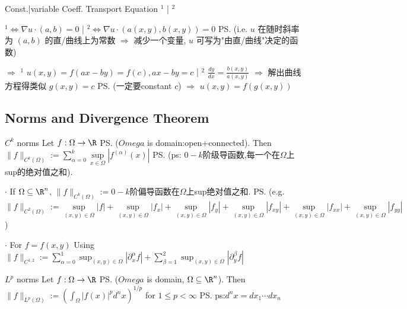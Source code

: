 \documentclass{note}
\begin{document}
\begin{MyTh}{Const.|variable Coeff. Transport Equation}
    $^1$ \quad | \quad $^2$

    \quad $^1\Leftrightarrow \nabla u \cdot (a,b) = 0$ \quad | \quad $^2\Leftrightarrow \nabla u \cdot (a(x,y),b(x,y)) = 0$ \qquad \ps{(i.e. $u$ 在随时斜率为 $(a,b)$ 的直/曲线上为常数 $\Rightarrow$ 减少一个变量, $u$ 可写为"由直/曲线"决定的函数)}
    
    \quad $\Rightarrow$ $^1$ $u(x,y)=f(ax-by)=f(c), ax-by=c$ \quad | \quad $^2$ $\frac{dy}{dx}=\frac{b(x,y)}{a(x,y)}$ $\Rightarrow$ {\scriptsize 解出曲线方程得类似 $g(x,y)=c$ \ps{(一定要constant $c$)}} $\Rightarrow$ $u(x,y)=f(g(x,y))$
\end{MyTh}


\subsection{Norms and Divergence Theorem}

\vspace{-8pt}
\begin{MyTh}{$C^k$ norms}
    Let $f:\Omega\to\R$ \ps{($Omega$ is domain:open+connected)}. Then $\|f\|_{C^k(\Omega)}:=\sum\limits_{\alpha=0}^k\sup\limits_{x\in\Omega}|f^{(\alpha)}(x)|$ \ps{(ps: $0-k$阶级导函数,每一个在$\Omega$上sup的绝对值之和)}.

    \vspace{-3pt}
    \quad $\cdot$ If $\Omega\subseteq\R^n$, $\|f\|_{C^k(\Omega)}:=${\footnotesize $0-k$阶偏导函数在$\Omega$上sup绝对值之和}. \ps{(e.g. $\|f\|_{C^2(\Omega)}:=\sup\limits_{(x,y)\in\Omega}|f|+\sup\limits_{(x,y)\in\Omega}|f_x|+\sup\limits_{(x,y)\in\Omega}|f_y|+\sup\limits_{(x,y)\in\Omega}|f_{xy}|+\sup\limits_{(x,y)\in\Omega}|f_{xx}|+\sup\limits_{(x,y)\in\Omega}|f_{yy}|$)}

    \vspace{-3pt}
    \quad $\cdot$ For $f=f(x,y)$ Using $\|f\|_{C^{1,2}}:=\sum_{\alpha=0}^1\sup_{(x,y)\in\Omega}|\partial_x^\alpha f|+\sum_{\beta=1}^2\sup_{(x,y)\in\Omega}|\partial_y^\beta f|$
\end{MyTh}

\vspace{-2pt}
\begin{MyTh}{$L^p$ norms}
    Let $f:\Omega\to\R$ \ps{($Omega$ is domain, $\Omega\subseteq\R^n$)}. Then {\small $\|f\|_{L^p(\Omega)}:=\left(\int_\Omega |f(x)|^p d^nx\right)^{1/p}$ for $1\le p<\infty$} \quad \ps{ps:$d^nx=dx_1\cdots dx_n$}
\end{MyTh}
\end{document}
